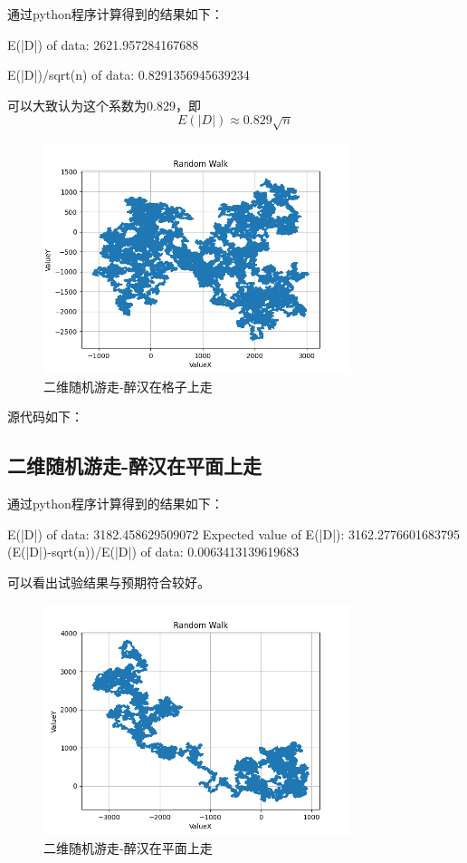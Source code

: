 \documentclass{article}
\begin{document}
通过python程序计算得到的结果如下：

E(|D|) of data: 2621.957284167688

E(|D|)/sqrt(n) of data: 0.8291356945639234

可以大致认为这个系数为0.829，即$$E(|D|)\approx0.829\sqrt{n}$$

\begin{figure}[H]
    \centering
    \includegraphics[width=0.8\textwidth]{img/Figure_2D1.png}
    \caption{二维随机游走-醉汉在格子上走}
\end{figure}

源代码如下：



\subsection{二维随机游走-醉汉在平面上走}

通过python程序计算得到的结果如下：

E(|D|) of data: 3182.458629509072
Expected value of E(|D|): 3162.2776601683795
(E(|D|)-sqrt(n))/E(|D|) of data: 0.0063413139619683

可以看出试验结果与预期符合较好。

\begin{figure}[H]
    \centering
    \includegraphics[width=0.8\textwidth]{img/Figure_2D2.png}
    \caption{二维随机游走-醉汉在平面上走}
\end{figure}
\end{document}
